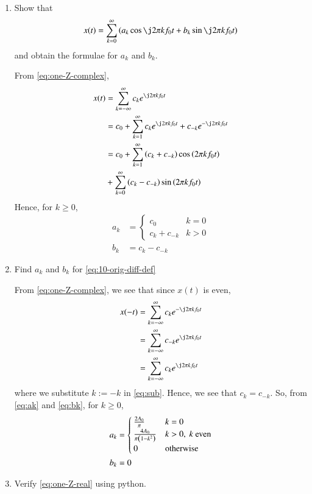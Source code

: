 \documentclass[journal,12pt,twocolumn]{IEEEtran}
\renewcommand\thesection{\arabic{section}}
\begin{document}
\begin{enumerate}[label=\thesection.\arabic*,ref=\thesection.\theenumi]
\item Show that 
\begin{align}
	x(t) = \sum_{k = 0}^{\infty}\brak{a_k\cos{\j2\pi kf_0 t}+b_k\sin{\j2\pi kf_0 t}}
\label{eq:one-Z-real}
\end{align}
and obtain the formulae for $a_k$ and $b_k$.

\solution From \eqref{eq:one-Z-complex},
\begin{align}
    x(t) &= \sum_{k = -\infty}^{\infty}c_ke^{\j2\pi kf_0 t} \\
         &= c_0 + \sum_{k = 1}^{\infty}c_ke^{\j2\pi kf_0t} + c_{-k}e^{-\j2\pi kf_0t} \\
         &= c_0 + \sum_{k = 1}^{\infty}\brak{c_k + c_{-k}}\cos\brak{2\pi kf_0t}  \nonumber \\
         &+ \sum_{k = 0}^{\infty}\brak{c_k - c_{-k}}\sin\brak{2\pi kf_0t}
\end{align}
Hence, for $k \ge 0$,
\begin{align}
    a_k &= 
    \begin{cases}
        c_0 & k = 0 \\
        c_k + c_{-k} & k > 0
    \end{cases} \label{eq:ak} \\
    b_k &= c_k - c_{-k}
    \label{eq:bk}
\end{align}
\item Find $a_k$ and $b_k$ for 
	\eqref{eq:10-orig-diff-def}

\solution From \eqref{eq:one-Z-complex}, we see that since $x(t)$ is even,
\begin{align}
    x(-t) &= \sum_{k = -\infty}^{\infty}c_ke^{-\j2\pi kf_0 t} \\
          &= \sum_{k = -\infty}^{\infty}c_{-k}e^{\j2\pi kf_0t} \label{eq:sub} \\
          &= \sum_{k = -\infty}^{\infty}c_ke^{\j2\pi kf_0 t}
\end{align}
where we substitute $k := -k$ in \eqref{eq:sub}. Hence, we see that 
$c_k = c_{-k}$. So, from \eqref{eq:ak} and \eqref{eq:bk}, for $k \ge 0$,
\begin{align}
    a_k &= 
    \begin{cases}
        \frac{2A_0}{\pi} & k = 0 \\
        \frac{4A_0}{\pi\left(1 - k^2\right)} & k > 0,\ k\ \text{even} \\
        0 & \text{otherwise}
    \end{cases} \label{eq:ak-xt}\\
    b_k &= 0
    \label{eq:bk-xt}
\end{align}
\item Verify 
\eqref{eq:one-Z-real}
using python.


\end{enumerate}
\end{document}
